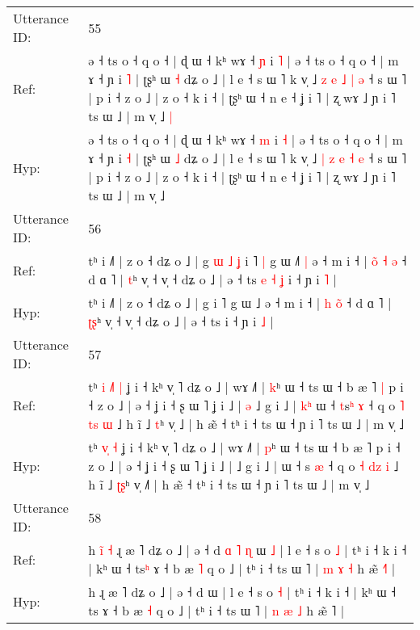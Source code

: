 \documentclass[10pt]{article}
\DeclareRobustCommand{\hl}[1]{{\textcolor{red}{#1}}}
\begin{document}
\begin{longtable}{ll}
 \\
\midrule
Utterance ID: & 55 \\
Ref: & ə ˧ ts o ˧ q o ˧ | ɖ ɯ ˧ kʰ wɤ ˧ \hl{ɲ} i \hl{˥} | ə ˧ ts o ˧ q o ˧ | m ɤ ˧ ɲ i \hl{˥} | ʈʂʰ ɯ \hl{˧} dʑ o ˩ | l e ˧ s ɯ ˥ k v̩ ˩ \hl{z} \hl{e} \hl{˩} \hl{|} \hl{ə} ˧ s ɯ ˥ | p i ˧ z o ˩ | z o ˧ k i ˧ | ʈʂʰ ɯ ˧ n e ˧ ʝ i ˥ | ʐ wɤ ˩ ɲ i ˥ ts ɯ ˩ | m v̩ ˩\hl{ }\hl{|}
 \\
Hyp: & ə ˧ ts o ˧ q o ˧ | ɖ ɯ ˧ kʰ wɤ ˧ \hl{m} i \hl{˧} | ə ˧ ts o ˧ q o ˧ | m ɤ ˧ ɲ i \hl{˧} | ʈʂʰ ɯ \hl{˩} dʑ o ˩ | l e ˧ s ɯ ˥ k v̩ ˩ \hl{|} \hl{z} \hl{e} \hl{˧} \hl{e} ˧ s ɯ ˥ | p i ˧ z o ˩ | z o ˧ k i ˧ | ʈʂʰ ɯ ˧ n e ˧ ʝ i ˥ | ʐ wɤ ˩ ɲ i ˥ ts ɯ ˩ | m v̩ ˩\hl{}\hl{}
 \\
\midrule
Utterance ID: & 56 \\
Ref: & tʰ i ˩˥ | z o ˧ dʑ o ˩ | g\hl{ }\hl{ɯ}\hl{ }\hl{˩}\hl{ }\hl{ʝ} i ˥\hl{ }\hl{|} g ɯ ˩\hl{˥}\hl{ }\hl{|} ə ˧ m i ˧ | \hl{o}\hl{̃} \hl{˧}\hl{ }\hl{ə} ˧ d ɑ ˥ | \hl{}\hl{t}ʰ v̩ ˧ v̩ ˧ dʑ o ˩ | ə ˧ ts\hl{ }\hl{e}\hl{ }\hl{˧}\hl{ }\hl{ʝ} i ˧ ɲ i \hl{˥} |
 \\
Hyp: & tʰ i ˩˥ | z o ˧ dʑ o ˩ | g\hl{}\hl{}\hl{}\hl{}\hl{}\hl{} i ˥\hl{}\hl{} g ɯ ˩\hl{}\hl{}\hl{} ə ˧ m i ˧ | \hl{}\hl{h} \hl{}\hl{o}\hl{̃} ˧ d ɑ ˥ | \hl{ʈ}\hl{ʂ}ʰ v̩ ˧ v̩ ˧ dʑ o ˩ | ə ˧ ts\hl{}\hl{}\hl{}\hl{}\hl{}\hl{} i ˧ ɲ i \hl{˩} |
 \\
\midrule
Utterance ID: & 57 \\
Ref: & tʰ\hl{ }\hl{i} \hl{˩}\hl{˥} \hl{|} ʝ i ˧ kʰ v̩ ˥ dʑ o ˩ | wɤ ˩˥ | \hl{k}ʰ ɯ ˧ ts ɯ ˧ b æ ˥\hl{ }\hl{|} p i ˧ z o ˩ | ə ˧ ʝ i ˧ ʂ ɯ ˥ ʝ i ˩ |\hl{ }\hl{ə} ˩ g i ˩ |\hl{ }\hl{k}\hl{ʰ} ɯ ˧ \hl{t}s\hl{ʰ} \hl{ɤ} ˧ q o \hl{˥} \hl{t}\hl{s} \hl{ɯ} ˩ h ĩ ˩ \hl{}\hl{t}ʰ v̩ ˩\hl{} | h æ̃ ˧ tʰ i ˧ ts ɯ ˧ ɲ i ˥ ts ɯ ˩ | m v̩ ˩
 \\
Hyp: & tʰ\hl{}\hl{} \hl{v}\hl{̩} \hl{˧} ʝ i ˧ kʰ v̩ ˥ dʑ o ˩ | wɤ ˩˥ | \hl{p}ʰ ɯ ˧ ts ɯ ˧ b æ ˥\hl{}\hl{} p i ˧ z o ˩ | ə ˧ ʝ i ˧ ʂ ɯ ˥ ʝ i ˩ |\hl{}\hl{} ˩ g i ˩ |\hl{}\hl{}\hl{} ɯ ˧ \hl{}s\hl{} \hl{æ} ˧ q o \hl{˧} \hl{d}\hl{z} \hl{i} ˩ h ĩ ˩ \hl{ʈ}\hl{ʂ}ʰ v̩ ˩\hl{˥} | h æ̃ ˧ tʰ i ˧ ts ɯ ˧ ɲ i ˥ ts ɯ ˩ | m v̩ ˩
 \\
\midrule
Utterance ID: & 58 \\
Ref: & h\hl{ }\hl{i}\hl{̃}\hl{ }\hl{˧} ɻ æ ˥ dʑ o ˩ | ə ˧ d\hl{ }\hl{ɑ}\hl{ }\hl{˥}\hl{ }\hl{ɳ} ɯ\hl{ }\hl{˩} | l e ˧ s o \hl{˩} | tʰ i ˧ k i ˧ | kʰ ɯ ˧ ts\hl{ʰ} ɤ ˧ b æ \hl{˥} q o ˩ | tʰ i ˧ ts ɯ ˥ | \hl{m} \hl{ɤ} \hl{˧} h æ̃ \hl{˧}˥ |
 \\
Hyp: & h\hl{}\hl{}\hl{}\hl{}\hl{} ɻ æ ˥ dʑ o ˩ | ə ˧ d\hl{}\hl{}\hl{}\hl{}\hl{}\hl{} ɯ\hl{}\hl{} | l e ˧ s o \hl{˧} | tʰ i ˧ k i ˧ | kʰ ɯ ˧ ts\hl{} ɤ ˧ b æ \hl{˧} q o ˩ | tʰ i ˧ ts ɯ ˥ | \hl{n} \hl{æ} \hl{˩} h æ̃ \hl{}˥ |

\end{longtable}
\end{document}
